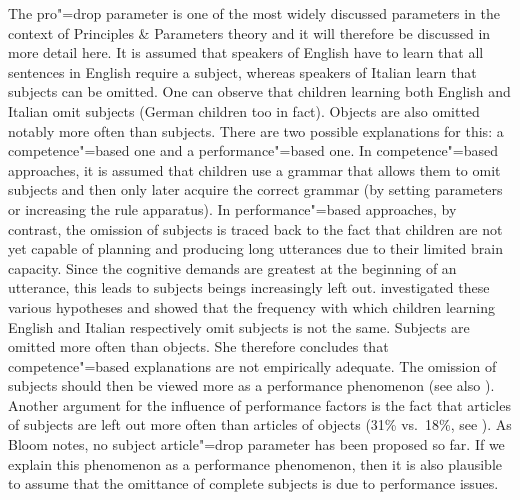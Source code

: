 The pro"=drop parameter is one of the most widely discussed parameters in the context of Principles \& Parameters theory and it will
therefore be discussed in more detail here. It is assumed that speakers of English have to learn that all sentences in English require
a subject, whereas speakers of Italian learn that subjects can be omitted.
One can observe that children learning both English and Italian omit subjects (German children too in fact).
Objects are also omitted notably more often than subjects.
There are two possible explanations for this: a competence"=based one and a performance"=based one.
In competence"=based approaches, it is assumed that children use a grammar that allows them to omit subjects and then only later acquire
the correct grammar (by setting parameters or increasing the rule apparatus). In performance"=based approaches, by contrast, the omission of subjects
is traced back to the fact that children are not yet capable of planning and producing long utterances due to their limited brain capacity.
Since the cognitive demands are greatest at the beginning of an utterance, this leads to subjects beings increasingly left out.
 \citet{Valian91a} investigated these various hypotheses and showed that the frequency with which children learning English and Italian respectively omit subjects
 is not the same. Subjects are omitted more often than objects. She therefore concludes that competence"=based explanations are
 not empirically adequate. The omission of
 subjects should then be viewed more as a performance phenomenon (see also \citealp{Bloom93a}). 
 Another argument for the influence of performance factors is the fact that articles of subjects are
 left out more often than articles of objects (31\% vs.\ 18\%, see \citealp[]{Gerken91a}). As Bloom notes, no subject article"=drop parameter has been proposed so
 far. If we explain this phenomenon as a performance phenomenon, then it is also plausible to assume that
the omittance of complete subjects is due to performance issues.

